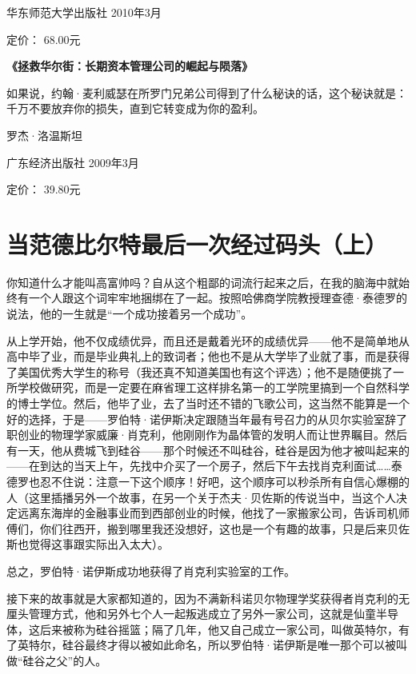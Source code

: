 华东师范大学出版社 2010年3月

定价： 68.00元

\textbf{《拯救华尔街：长期资本管理公司的崛起与陨落》}

如果说，约翰·麦利威瑟在所罗门兄弟公司得到了什么秘诀的话，这个秘诀就是：千万不要放弃你的损失，直到它转变成为你的盈利。

罗杰·洛温斯坦

广东经济出版社 2009年3月

定价： 39.80元

\hypertarget{ux5f53ux8303ux5fb7ux6bd4ux5c14ux7279ux6700ux540eux4e00ux6b21ux7ecfux8fc7ux7801ux5934ux4e0a}{%
\section{当范德比尔特最后一次经过码头（上）}\label{ux5f53ux8303ux5fb7ux6bd4ux5c14ux7279ux6700ux540eux4e00ux6b21ux7ecfux8fc7ux7801ux5934ux4e0a}}

你知道什么才能叫高富帅吗？自从这个粗鄙的词流行起来之后，在我的脑海中就始终有一个人跟这个词牢牢地捆绑在了一起。按照哈佛商学院教授理查德·泰德罗的说法，他的一生就是``一个成功接着另一个成功''。

从上学开始，他不仅成绩优异，而且还是戴着光环的成绩优异------他不是简单地从高中毕了业，而是毕业典礼上的致词者；他也不是从大学毕了业就了事，而是获得了美国优秀大学生的称号（我还真不知道美国也有这个评选）；他不是随便挑了一所学校做研究，而是一定要在麻省理工这样排名第一的工学院里搞到一个自然科学的博士学位。然后，他毕了业，去了当时还不错的飞歌公司，这当然不能算是一个好的选择，于是------罗伯特·诺伊斯决定跟随当年最有号召力的从贝尔实验室辞了职创业的物理学家威廉·肖克利，他刚刚作为晶体管的发明人而让世界瞩目。然后有一天，他从费城飞到硅谷------那个时候还不叫硅谷，硅谷是因为他才被叫起来的------在到达的当天上午，先找中介买了一个房子，然后下午去找肖克利面试\ldots\ldots 泰德罗也忍不住说：注意一下这个顺序！好吧，这个顺序可以秒杀所有自信心爆棚的人（这里插播另外一个故事，在另一个关于杰夫·贝佐斯的传说当中，当这个人决定远离东海岸的金融事业而到西部创业的时候，他找了一家搬家公司，告诉司机师傅们，你们往西开，搬到哪里我还没想好，这也是一个有趣的故事，只是后来贝佐斯也觉得这事跟实际出入太大）。

总之，罗伯特·诺伊斯成功地获得了肖克利实验室的工作。

接下来的故事就是大家都知道的，因为不满新科诺贝尔物理学奖获得者肖克利的无厘头管理方式，他和另外七个人一起叛逃成立了另外一家公司，这就是仙童半导体，这后来被称为硅谷摇篮；隔了几年，他又自己成立一家公司，叫做英特尔，有了英特尔，硅谷最终才得以被如此命名，所以罗伯特·诺伊斯是唯一那个可以被叫做``硅谷之父''的人。

